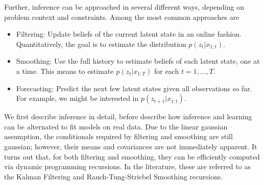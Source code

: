 \documentclass[14pt]{extreport}
\begin{document}
Further, inference can be approached in several different ways, depending on
problem context and constraints. Among the most common approaches are

\begin{itemize}
\item Filtering: Update beliefs of the current latent state in an online
  fashion. Quantitatively, the goal is to estimate the distribution
  $p\left(z_{t} \vert x_{1:t}\right)$.
\item Smoothing: Use the full history to estimate beliefs of each latent state,
  one at a time. This means to estimate $p\left(z_{t} \vert x_{1:T}\right)$ for
  each $t = 1, \dots, T$.
\item Forecasting: Predict the next few latent states given all observations so
  far. For example, we might be interested in $p\left(z_{t + 1} \vert
  x_{1:t}\right)$.
\end{itemize}

\begin{figure}
  \centering
  \caption{\label{fig:lds_graphical} }
\end{figure}

We first describe inference in detail, before describe how inference and
learning can be alternated to fit models on real data. Due to the linear
gaussian assumption, the conditionals required by filtering and smoothing are
still gaussian; however, their means and covariances are not immediately
apparent. It turns out that, for both filtering and smoothing, they can be
efficiently computed via dynamic programming recursions. In the literature,
these are referred to as the Kalman Filtering and Rauch-Tung-Striebel Smoothing
recursions.
\end{document}
